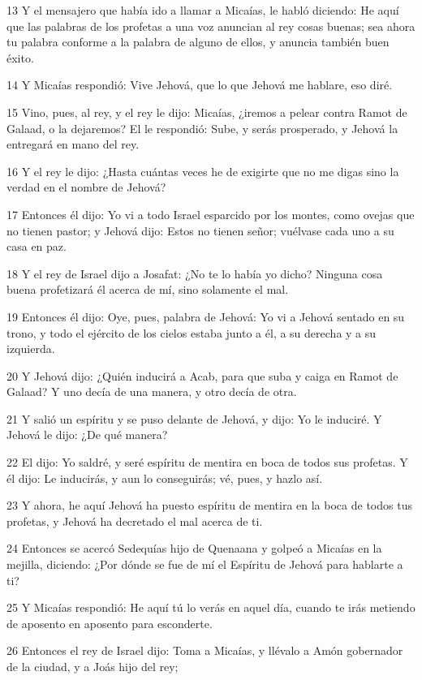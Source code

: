 \par 13 Y el mensajero que había ido a llamar a Micaías, le habló diciendo: He aquí que las palabras de los profetas a una voz anuncian al rey cosas buenas; sea ahora tu palabra conforme a la palabra de alguno de ellos, y anuncia también buen éxito.
\par 14 Y Micaías respondió: Vive Jehová, que lo que Jehová me hablare, eso diré.
\par 15 Vino, pues, al rey, y el rey le dijo: Micaías, ¿iremos a pelear contra Ramot de Galaad, o la dejaremos? El le respondió: Sube, y serás prosperado, y Jehová la entregará en mano del rey.
\par 16 Y el rey le dijo: ¿Hasta cuántas veces he de exigirte que no me digas sino la verdad en el nombre de Jehová?
\par 17 Entonces él dijo: Yo vi a todo Israel esparcido por los montes, como ovejas que no tienen pastor; y Jehová dijo: Estos no tienen señor; vuélvase cada uno a su casa en paz.
\par 18 Y el rey de Israel dijo a Josafat: ¿No te lo había yo dicho? Ninguna cosa buena profetizará él acerca de mí, sino solamente el mal.
\par 19 Entonces él dijo: Oye, pues, palabra de Jehová: Yo vi a Jehová sentado en su trono, y todo el ejército de los cielos estaba junto a él, a su derecha y a su izquierda.
\par 20 Y Jehová dijo: ¿Quién inducirá a Acab, para que suba y caiga en Ramot de Galaad? Y uno decía de una manera, y otro decía de otra.
\par 21 Y salió un espíritu y se puso delante de Jehová, y dijo: Yo le induciré. Y Jehová le dijo: ¿De qué manera?
\par 22 El dijo: Yo saldré, y seré espíritu de mentira en boca de todos sus profetas. Y él dijo: Le inducirás, y aun lo conseguirás; vé, pues, y hazlo así.
\par 23 Y ahora, he aquí Jehová ha puesto espíritu de mentira en la boca de todos tus profetas, y Jehová ha decretado el mal acerca de ti.
\par 24 Entonces se acercó Sedequías hijo de Quenaana y golpeó a Micaías en la mejilla, diciendo: ¿Por dónde se fue de mí el Espíritu de Jehová para hablarte a ti?
\par 25 Y Micaías respondió: He aquí tú lo verás en aquel día, cuando te irás metiendo de aposento en aposento para esconderte.
\par 26 Entonces el rey de Israel dijo: Toma a Micaías, y llévalo a Amón gobernador de la ciudad, y a Joás hijo del rey;
